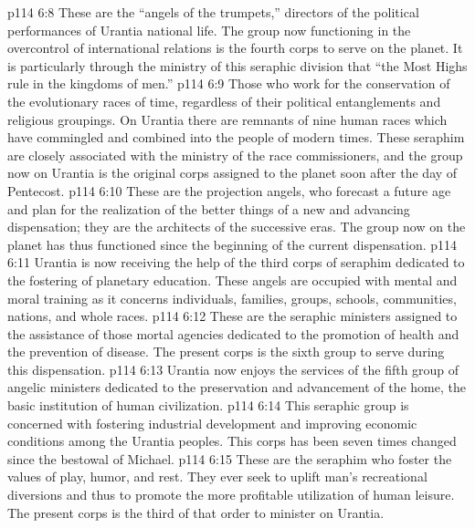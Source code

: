 \pc \vs p114 6:8 \bibnobreakspace {} These are the “angels of the trumpets,” directors of the political performances of Urantia national life. The group now functioning in the overcontrol of international relations is the fourth corps to serve on the planet. It is particularly through the ministry of this seraphic division that “the Most Highs rule in the kingdoms of men.”
\pc \vs p114 6:9 \bibnobreakspace {} Those who work for the conservation of the evolutionary races of time, regardless of their political entanglements and religious groupings. On Urantia there are remnants of nine human races which have commingled and combined into the people of modern times. These seraphim are closely associated with the ministry of the race commissioners, and the group now on Urantia is the original corps assigned to the planet soon after the day of Pentecost.
\pc \vs p114 6:10 \bibnobreakspace {} These are the projection angels, who forecast a future age and plan for the realization of the better things of a new and advancing dispensation; they are the architects of the successive eras. The group now on the planet has thus functioned since the beginning of the current dispensation.
\pc \vs p114 6:11 \bibnobreakspace {} Urantia is now receiving the help of the third corps of seraphim dedicated to the fostering of planetary education. These angels are occupied with mental and moral training as it concerns individuals, families, groups, schools, communities, nations, and whole races.
\pc \vs p114 6:12 \bibnobreakspace {} These are the seraphic ministers assigned to the assistance of those mortal agencies dedicated to the promotion of health and the prevention of disease. The present corps is the sixth group to serve during this dispensation.
\pc \vs p114 6:13 \bibnobreakspace {} Urantia now enjoys the services of the fifth group of angelic ministers dedicated to the preservation and advancement of the home, the basic institution of human civilization.
\pc \vs p114 6:14 \bibnobreakspace {} This seraphic group is concerned with fostering industrial development and improving economic conditions among the Urantia peoples. This corps has been seven times changed since the bestowal of Michael.
\pc \vs p114 6:15 \bibnobreakspace {} These are the seraphim who foster the values of play, humor, and rest. They ever seek to uplift man’s recreational diversions and thus to promote the more profitable utilization of human leisure. The present corps is the third of that order to minister on Urantia.
